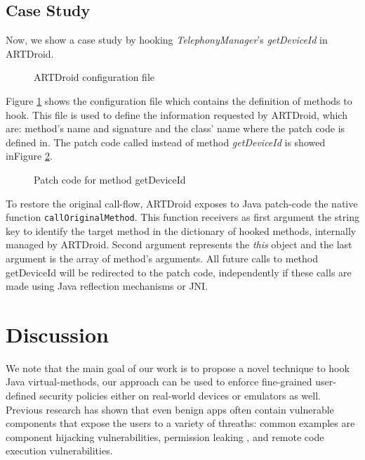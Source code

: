 \subsection{Case Study}
\label{sec:usage}

Now, we show a case study by hooking \textit{TelephonyManager}'s \textit{getDeviceId} in ARTDroid.

\begin{figure}[ht]
\begin{center}

\caption{ARTDroid configuration file}
\label{artconf}
\end{center}
\end{figure}

Figure \ref{artconf} shows the configuration file which contains the definition of methods to hook. 
This file is used to define the information requested by ARTDroid, which are: method's name and signature and the class' name where the patch code is defined in. 
The patch code called instead of method \textit{getDeviceId} is showed inFigure \ref{artpatch}.


\begin{figure}[ht]
\begin{center}

\caption{Patch code for method getDeviceId}
\label{artpatch}
\end{center}
\end{figure}

To restore the original call-flow, ARTDroid exposes to Java patch-code the native function {\tt callOriginalMethod}. This function receivers as first argument the string key to identify the target method in the dictionary of hooked methods, internally managed by ARTDroid. Second argument represents the \textit{this} object and the last argument is the array of method's arguments. All future calls to method getDeviceId will be redirected to the patch code, independently if these calls are made using Java reflection mechanisms or JNI.

\section{Discussion}
\label{sec:discuss}

We note that the main goal of our work is to  propose a novel technique to hook Java virtual-methods, our approach can be used to enforce fine-grained user-defined security policies either on real-world devices or emulators as well. Previous research has shown that even benign apps often contain vulnerable components that expose the users to a variety of threaths: common examples are component hijacking vulnerabilities\cite{lu2012chex}, permission leaking \cite{grace2012systematic},\cite{jiang2013detecting} and remote code execution vulnerabilities\cite{poeplau2014execute}.

